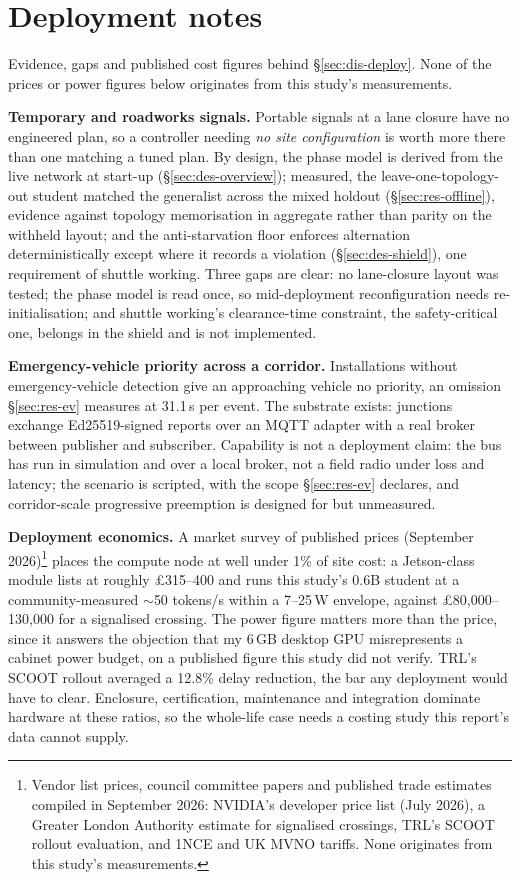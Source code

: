\section{Deployment notes}\label{app:deploy}
Evidence, gaps and published cost figures behind \S\ref{sec:dis-deploy}.
None of the prices or power figures below originates from this study's
measurements.

\textbf{Temporary and roadworks signals.} Portable signals at a lane
closure have no engineered plan, so a controller needing \emph{no site
configuration} is worth more there than one matching a tuned plan. By
design, the phase model is derived from the live network at start-up
(\S\ref{sec:des-overview}); measured, the leave-one-topology-out student
matched the generalist across the mixed holdout (\S\ref{sec:res-offline}),
evidence against topology memorisation in aggregate rather than parity on
the withheld layout; and the anti-starvation floor enforces alternation
deterministically except where it records a violation
(\S\ref{sec:des-shield}), one requirement of shuttle working. Three gaps
are clear: no lane-closure layout was tested; the phase model is read
once, so mid-deployment reconfiguration needs re-initialisation; and
shuttle working's clearance-time constraint, the safety-critical one,
belongs in the shield and is not implemented.

\textbf{Emergency-vehicle priority across a corridor.} Installations
without emergency-vehicle detection give an approaching vehicle no
priority, an omission \S\ref{sec:res-ev} measures at 31.1\,s per event.
The substrate exists: junctions exchange Ed25519-signed reports over an
MQTT adapter with a real broker between publisher and subscriber.
Capability is not a deployment claim: the bus has run in simulation and
over a local broker, not a field radio under loss and latency; the
scenario is scripted, with the scope \S\ref{sec:res-ev} declares, and
corridor-scale progressive preemption is designed for but unmeasured.

\textbf{Deployment economics.} A market survey of published prices
(September 2026)\footnote{Vendor list prices, council committee papers and
published trade estimates compiled in September 2026: NVIDIA's developer
price list (July 2026), a Greater London Authority estimate for signalised
crossings, TRL's SCOOT rollout evaluation, and 1NCE and UK MVNO tariffs.
None originates from this study's measurements.} places the compute node
at well under 1\% of site cost: a Jetson-class module lists at roughly
\pounds315--400 and runs this study's 0.6B student at a community-measured
$\sim$50 tokens/s within a 7--25\,W envelope, against
\pounds80,000--130,000 for a signalised crossing. The power figure matters
more than the price, since it answers the objection that my 6\,GB desktop
GPU misrepresents a cabinet power budget, on a published figure this study
did not verify. TRL's SCOOT rollout averaged a 12.8\% delay reduction, the
bar any deployment would have to clear. Enclosure, certification,
maintenance and integration dominate hardware at these ratios, so the
whole-life case needs a costing study this report's data cannot supply.
